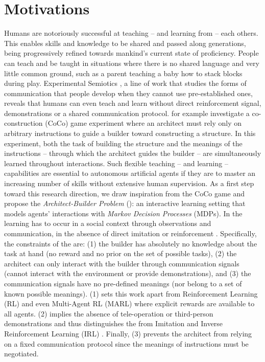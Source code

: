 \section{Motivations}

Humans are notoriously successful at teaching -- and learning from -- each others. This enables skills and knowledge to be shared and passed along generations, being progressively refined towards mankind's current state of proficiency. People can teach and be taught in situations where there is no shared language and very little common ground, such as a parent teaching a baby how to stack blocks during play. Experimental Semiotics \cite{galantucci2011experimental}, a line of work that studies the forms of communication that people develop when they cannot use pre-established ones, reveals that humans can even teach and learn without direct reinforcement signal, demonstrations or a shared communication protocol. \cite{vollmer2014studying} for example investigate a co-construction (CoCo) game experiment where an architect must rely only on arbitrary instructions to guide a builder toward constructing a structure. In this experiment, both the task of building the structure and the meanings of the instructions -- through which the architect guides the builder -- are simultaneously learned throughout interactions. Such flexible teaching -- and learning -- capabilities are essential to autonomous artificial agents if they are to master an increasing number of skills without extensive human supervision.
As a first step toward this research direction, we draw inspiration from the CoCo game and propose the \textit{Architect-Builder Problem} (\abp): an interactive learning setting that models agents' interactions with \textit{Markov Decision Processes} \cite{puterman2014markov} (MDPs). 
In the \abp learning has to occur in a social context through observations and communication, in the absence of direct imitation or reinforcement \cite{bandura1977social}. Specifically, the constraints of the \abp are: (1) the builder has absolutely no knowledge about the task at hand (no reward and no prior on the set of possible tasks), (2) the architect can only interact with the builder through communication signals (cannot interact with the environment or provide demonstrations), and (3) the communication signals have no pre-defined meanings (nor belong to a set of known possible meanings). 
(1) sets this work apart from Reinforcement Learning (RL) and even Multi-Agent RL (MARL) where explicit rewards are available to all  agents. (2) implies the absence of tele-operation or third-person demonstrations and thus distinguishes the \abp from Imitation and Inverse Reinforcement Learning (IRL)%
. Finally, (3) prevents the architect from relying on a fixed communication protocol since the meanings of instructions must be negotiated.

